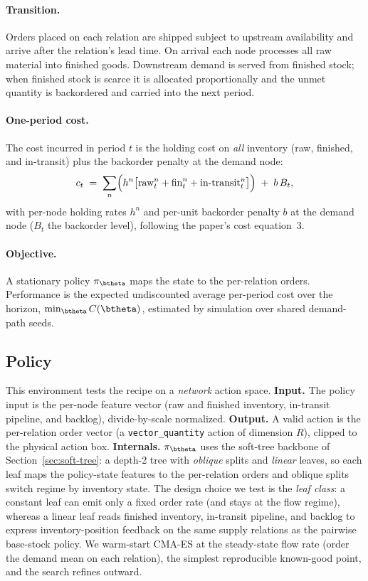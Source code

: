 \paragraph{Transition.}
Orders placed on each relation are shipped subject to upstream availability and arrive after the
relation's lead time. On arrival each node processes all raw material into finished goods. Downstream
demand is served from finished stock; when finished stock is scarce it is allocated proportionally and
the unmet quantity is backordered and carried into the next period.

\paragraph{One-period cost.}
The cost incurred in period $t$ is the holding cost on \emph{all} inventory (raw, finished, and
in-transit) plus the backorder penalty at the demand node:
\begin{equation}
    \label{eq:pirhoo-cost}
    c_t \;=\; \sum_{n}\Bigl(h^{n}\bigl[\text{raw}^{n}_t+\text{fin}^{n}_t+\text{in-transit}^{n}_t\bigr]\Bigr) \;+\; b\,B_t ,
\end{equation}
with per-node holding rates $h^{n}$ and per-unit backorder penalty $b$ at the demand node ($B_t$ the
backorder level), following the paper's cost equation~3.

\paragraph{Objective.}
A stationary policy $\pi_{\btheta}$ maps the state to the per-relation orders. Performance is the
expected undiscounted average per-period cost over the horizon, $\min_{\btheta} C(\btheta)$, estimated
by simulation over shared demand-path seeds.

\FloatBarrier

\subsection{Policy}
\label{sec:pirhoo-policy}

This environment tests the recipe on a \emph{network} action space. \textbf{Input.} The policy input
is the per-node feature vector (raw and finished inventory, in-transit pipeline, and backlog),
divide-by-scale normalized. \textbf{Output.} A valid action is the per-relation order vector (a
\texttt{vector\_quantity} action of dimension $R$), clipped to the physical action box.
\textbf{Internals.} $\pi_{\btheta}$ uses the soft-tree backbone of Section~\ref{sec:soft-tree}: a
depth-2 tree with \emph{oblique} splits and \emph{linear} leaves, so each leaf maps the policy-state
features to the per-relation orders and oblique splits switch regime by inventory state. The design
choice we test is the \emph{leaf class}: a constant leaf can emit only a fixed order rate (and stays
at the flow regime), whereas a linear leaf reads finished inventory, in-transit pipeline, and backlog
to express inventory-position feedback on the same supply relations as the pairwise base-stock policy.
We warm-start CMA-ES at the steady-state flow rate (order the demand mean on each relation), the
simplest reproducible known-good point, and the search refines outward.

